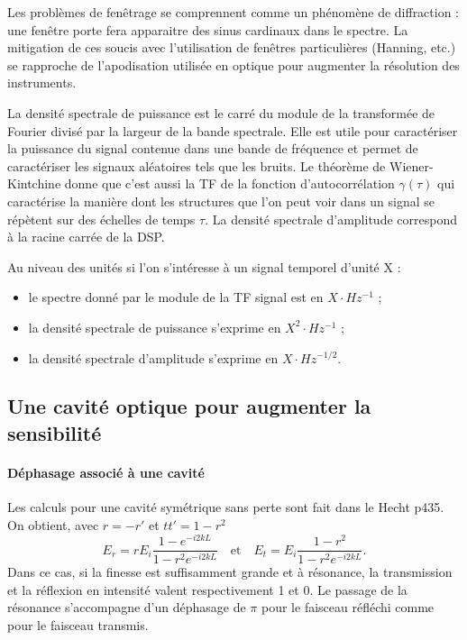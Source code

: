 \documentclass[12pt,a4paper]{article}
\begin{document}
Les problèmes de fenêtrage se comprennent comme un phénomène de diffraction : une fenêtre porte fera apparaitre des sinus cardinaux dans le spectre.
La mitigation de ces soucis avec l'utilisation de fenêtres particulières (Hanning, etc.) se rapproche de l'apodisation utilisée en optique pour augmenter la résolution des instruments.

La densité spectrale de puissance est le carré du module de la transformée de Fourier divisé par la largeur de la bande spectrale.
Elle est utile pour caractériser la puissance du signal contenue dans une bande de fréquence et permet de caractériser les signaux aléatoires tels que les bruits.
Le théorème de Wiener-Kintchine donne que c'est aussi la TF de la fonction d'autocorrélation $\gamma(\tau)$ qui caractérise la manière dont les structures que l'on peut voir dans un signal se répètent sur des échelles de temps $\tau$.
La densité spectrale d'amplitude correspond à la racine carrée de la DSP.

Au niveau des unités si l'on s'intéresse à un signal temporel d'unité X :
\begin{itemize}
\item le spectre donné par le module de la TF signal est en $\unit{}{X\cdot Hz^{-1}}$ ;
\item la densité spectrale de puissance s'exprime en $\unit{}{X^2\cdot Hz^{-1}}$ ;
\item la densité spectrale d'amplitude s'exprime en $\unit{}{X\cdot Hz^{-1/2}}$.
\end{itemize}


\subsection{Une cavité optique pour augmenter la sensibilité}
\label{sec:cavity}

\paragraph{Déphasage associé à une cavité\\}
Les calculs pour une cavité symétrique sans perte sont fait dans le Hecht p435.
On obtient, avec $r=-r'$ et $tt'=1-r^2$
\begin{equation}
E_r = rE_i \frac{1-e^{-i2kL}}{1-r^2e^{-i2kL}} \quad \mathrm{et} \quad
E_t = E_i \frac{1-r^2}{1-r^2e^{-i2kL}}.
\end{equation}
Dans ce cas, si la finesse est suffisamment grande et à résonance, la transmission et la réflexion en intensité valent respectivement 1 et 0.
Le passage de la résonance s'accompagne d'un déphasage de $\pi$ pour le faisceau réfléchi comme pour le faisceau transmis.
\end{document}
